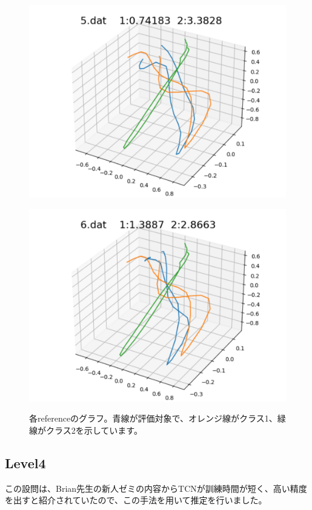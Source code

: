 \begin{figure}[h]
\begin{minipage}[b]{0.32\linewidth}
  \includegraphics[keepaspectratio, scale=0.3]
  {./pic/level3/5_dat_l3.pdf}
  \label{5dat}
 \end{minipage}
  \begin{minipage}[b]{0.32\linewidth}
  \centering
  \includegraphics[keepaspectratio, scale=0.3]
  {./pic/level3/6_dat_l3.pdf}
  \label{6dat}
 \end{minipage}
 \caption{各referenceのグラフ。青線が評価対象で、オレンジ線がクラス1、緑線がクラス2を示しています。}\label{reg_poly}
\end{figure}

\newpage

\subsection*{Level4}
この設問は、Brian先生の新人ゼミの内容からTCNが訓練時間が短く、高い精度を出すと紹介されていたので、この手法を用いて推定を行いました。
	
	
	

